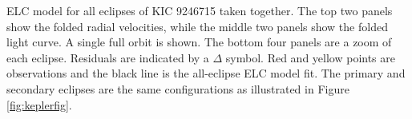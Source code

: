 \label{fig:ELCresult} ELC model for all eclipses of KIC 9246715 taken together. The top two panels show the folded radial velocities, while the middle two panels show the folded light curve. A single full orbit is shown. The bottom four panels are a zoom of each eclipse. Residuals are indicated by a $\Delta$ symbol. Red and yellow points are observations and the black line is the all-eclipse ELC model fit. The primary and secondary eclipses are the same configurations as illustrated in Figure \ref{fig:keplerfig}. 